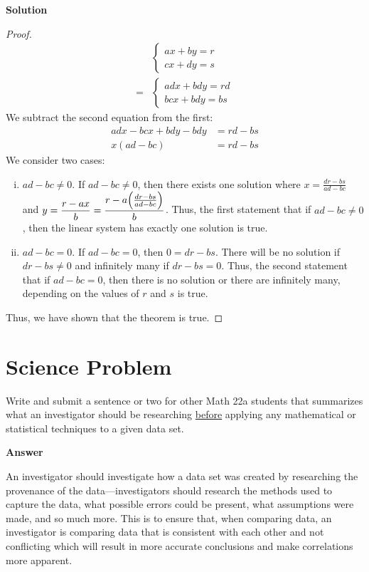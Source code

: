 \documentclass[11pt]{scrartcl}
\theoremstyle{dotlessP}
\theoremstyle{dotlessN}
\DeclarePairedDelimiter\paren{(}{)} %
\begin{document}
\textbf{Solution}
\begin{proof}
	\begin{align*}
		&\begin{cases}
			ax + by = r \\
			cx + dy = s 
		\end{cases} \\  
		=&\begin{cases}
			adx + bdy = rd \\
			bcx + bdy = bs
		\end{cases} 
	\end{align*}
	We subtract the second equation from the first:
	\begin{align*}
		adx - bcx + bdy - bdy &= rd - bs \\	
		x(ad-bc) &= rd - bs 
	\end{align*}
		We consider two cases:
		\begin{enumerate}[i)]
			\item $ad-bc \neq 0$. If $ad-bc \neq 0$, then there exists one solution where $x = \displaystyle \frac{dr-bs}{ad-bc}$ and  $y = \displaystyle \frac{r-ax}{b} = \frac{r-a\paren*{\frac{dr-bs}{ad-bc}}}{b}$. Thus, the first statement that if  $ad-bc \neq 0$, then the linear system has exactly one solution is true.
			\item $ad-bc = 0$. If $ad-bc = 0$, then $0 = dr-bs$. There will be no solution if $dr-bs \neq 0$ and infinitely many if $dr-bs = 0$. Thus, the second statement that if $ad-bc = 0$, then there is no solution or there are infinitely many, depending on the values of $r$ and $s$ is true.
		\end{enumerate}
		Thus, we have shown that the theorem is true.
\end{proof}
\section{Science Problem}
\begin{ques}
	Write and submit a sentence or two for other Math 22a students that summarizes what an investigator should be researching \underline{before} applying any mathematical or statistical techniques to a given data set.	
\end{ques}
\textbf{Answer}

An investigator should investigate how a data set was created by researching the provenance of the data---investigators should research the methods used to capture the data, what possible errors could be present, what assumptions were made, and so much more. This is to ensure that, when comparing data, an investigator is comparing data that is consistent with each other and not conflicting which will result in more accurate conclusions and make correlations more apparent. 
\end{document}
